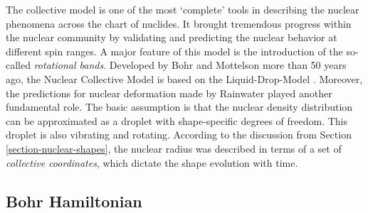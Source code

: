 The collective model is one of the most `complete' tools in describing the nuclear phenomena across the chart of nuclides. It brought tremendous progress within the nuclear community by validating and predicting the nuclear behavior at different spin ranges. A major feature of this model is the introduction of the so-called \emph{rotational bands}. Developed by Bohr and Mottelson \cite{bohr1953collective,bohr1998nuclear} more than 50 years ago, the Nuclear Collective Model is based on the Liquid-Drop-Model \cite{meitner1939disintegration,bohr1939mechanism,myers1974nuclear}. Moreover, the predictions for nuclear deformation made by Rainwater \cite{rainwater1950nuclear} played another fundamental role. The basic assumption is that the nuclear density distribution can be approximated as a droplet with shape-specific degrees of freedom. This droplet is also vibrating and rotating. According to the discussion from Section \ref{section-nuclear-shapes}, the nuclear radius was described in terms of a set of \emph{collective coordinates}, which dictate the shape evolution with time.

\subsection{Bohr Hamiltonian}
\label{bohr-hamiltonian}

